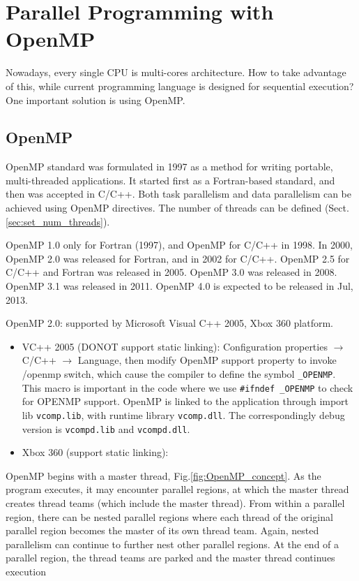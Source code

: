 \chapter{Parallel Programming with OpenMP}
\label{chap:OpenMP}

Nowadays, every single CPU is multi-cores architecture. How to take advantage of
this, while current programming language is designed for sequential execution?
One important solution is using OpenMP.

\section{OpenMP}

OpenMP standard was formulated in 1997 as a method for writing portable,
multi-threaded applications. It started first as a Fortran-based standard, and
then was accepted in C/C++. Both task parallelism and data parallelism can be
achieved using OpenMP directives. The number of threads can be defined
(Sect.\ref{sec:set_num_threads}).

OpenMP 1.0 only for Fortran (1997), and OpenMP for C/C++ in 1998. In 2000,
OpenMP 2.0 was released for Fortran, and in 2002 for C/C++. OpenMP 2.5 for C/C++
and Fortran was released in 2005. OpenMP 3.0 was released in 2008. OpenMP 3.1
was released in 2011. OpenMP 4.0 is expected to be released in Jul, 2013.

\begin{mdframed}
OpenMP 2.0: supported by Microsoft Visual C++ 2005, Xbox 360 platform.
\begin{itemize}
  \item VC++ 2005 (DONOT support static linking): Configuration properties
  $\rightarrow$ C/C++ $\rightarrow$ Language, then modify OpenMP support property to invoke /openmp
  switch, which cause the compiler to define the symbol \verb!_OPENMP!. This
  macro is important in the code where we use \verb!#ifndef _OPENMP! to check
  for OPENMP support. OpenMP is linked to the application through import lib
  \verb!vcomp.lib!, with runtime library \verb!vcomp.dll!. The correspondingly
  debug version is \verb!vcompd.lib! and \verb!vcompd.dll!.
  \item Xbox 360 (support static linking): 
\end{itemize}
\end{mdframed}

OpenMP begins with a master thread, Fig.\ref{fig:OpenMP_concept}. As the program
executes, it may encounter parallel regions, at which the master thread creates
thread teams (which include the master thread). From within a parallel region,
there can be nested parallel regions where each thread of the original parallel
region becomes the master of its own thread team. Again, nested parallelism can
continue to further nest other parallel regions.
At the end of a parallel region, the thread teams are parked and the master
thread continues execution

